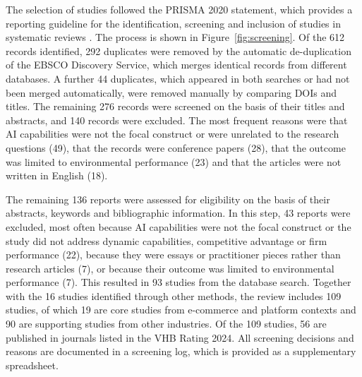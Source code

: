 The selection of studies followed the PRISMA 2020 statement, which provides a reporting guideline for the identification, screening and inclusion of studies in systematic reviews \parencite[178]{page2021}. The process is shown in Figure~\ref{fig:screening}. Of the 612 records identified, 292 duplicates were removed by the automatic de-duplication of the EBSCO Discovery Service, which merges identical records from different databases. A further 44 duplicates, which appeared in both searches or had not been merged automatically, were removed manually by comparing DOIs and titles. The remaining 276 records were screened on the basis of their titles and abstracts, and 140 records were excluded. The most frequent reasons were that AI capabilities were not the focal construct or were unrelated to the research questions (49), that the records were conference papers (28), that the outcome was limited to environmental performance (23) and that the articles were not written in English (18).

The remaining 136 reports were assessed for eligibility on the basis of their abstracts, keywords and bibliographic information. In this step, 43 reports were excluded, most often because AI capabilities were not the focal construct or the study did not address dynamic capabilities, competitive advantage or firm performance (22), because they were essays or practitioner pieces rather than research articles (7), or because their outcome was limited to environmental performance (7). This resulted in 93 studies from the database search. Together with the 16 studies identified through other methods, the review includes 109 studies, of which 19 are core studies from e-commerce and platform contexts and 90 are supporting studies from other industries. Of the 109 studies, 56 are published in journals listed in the VHB Rating 2024. All screening decisions and reasons are documented in a screening log, which is provided as a supplementary spreadsheet.

